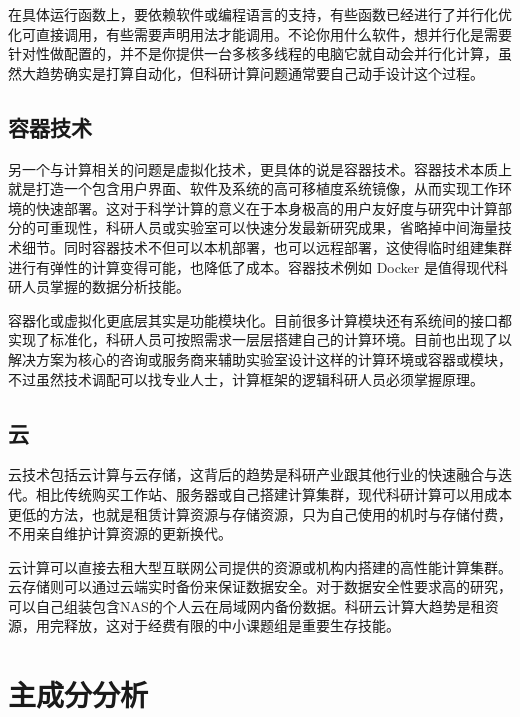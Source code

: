 \documentclass[]{tufte-book}
\begin{document}
在具体运行函数上，要依赖软件或编程语言的支持，有些函数已经进行了并行化优化可直接调用，有些需要声明用法才能调用。不论你用什么软件，想并行化是需要针对性做配置的，并不是你提供一台多核多线程的电脑它就自动会并行化计算，虽然大趋势确实是打算自动化，但科研计算问题通常要自己动手设计这个过程。

\hypertarget{ux5bb9ux5668ux6280ux672f}{%
\subsection{容器技术}\label{ux5bb9ux5668ux6280ux672f}}

另一个与计算相关的问题是虚拟化技术，更具体的说是容器技术。容器技术本质上就是打造一个包含用户界面、软件及系统的高可移植度系统镜像，从而实现工作环境的快速部署。这对于科学计算的意义在于本身极高的用户友好度与研究中计算部分的可重现性，科研人员或实验室可以快速分发最新研究成果，省略掉中间海量技术细节。同时容器技术不但可以本机部署，也可以远程部署，这使得临时组建集群进行有弹性的计算变得可能，也降低了成本。容器技术例如 Docker 是值得现代科研人员掌握的数据分析技能。

容器化或虚拟化更底层其实是功能模块化。目前很多计算模块还有系统间的接口都实现了标准化，科研人员可按照需求一层层搭建自己的计算环境。目前也出现了以解决方案为核心的咨询或服务商来辅助实验室设计这样的计算环境或容器或模块，不过虽然技术调配可以找专业人士，计算框架的逻辑科研人员必须掌握原理。

\hypertarget{ux4e91}{%
\subsection{云}\label{ux4e91}}

云技术包括云计算与云存储，这背后的趋势是科研产业跟其他行业的快速融合与迭代。相比传统购买工作站、服务器或自己搭建计算集群，现代科研计算可以用成本更低的方法，也就是租赁计算资源与存储资源，只为自己使用的机时与存储付费，不用亲自维护计算资源的更新换代。

云计算可以直接去租大型互联网公司提供的资源或机构内搭建的高性能计算集群。云存储则可以通过云端实时备份来保证数据安全。对于数据安全性要求高的研究，可以自己组装包含NAS的个人云在局域网内备份数据。科研云计算大趋势是租资源，用完释放，这对于经费有限的中小课题组是重要生存技能。

\hypertarget{ux4e3bux6210ux5206ux5206ux6790}{%
\section{主成分分析}\label{ux4e3bux6210ux5206ux5206ux6790}}
\end{document}
